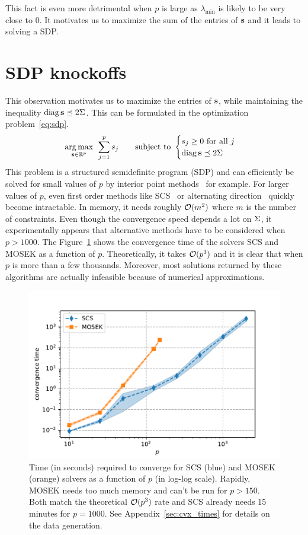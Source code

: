 This fact is even more detrimental when $p$ is large as $\lambda_{\min}$ is likely to be very close to $0$.
It motivates us to maximize the sum of the entries of $\mathbf{s}$ and it leads to solving a SDP\@.

\section{SDP knockoffs}\label{sec:sdp}

This observation motivates us to maximize the entries of $\mathbf{s}$,
while maintaining the inequality $\operatorname*{diag}\mathbf{s} \preceq 2\Sigma$.
This can be formulated in the optimization problem~\ref{eq:sdp}.
\begin{equation}\label{eq:sdp}
    \underset{\mathbf{s} \in \mathbb{R}^p}{\operatorname*{arg\,max}}\;\,
    \sum_{j = 1}^p s_j
    \qquad
    \text{subject to } \begin{cases}
        s_j \geq 0\text{ for all } j\\
        \operatorname*{diag} \mathbf{s} \preceq 2\Sigma
    \end{cases}
\end{equation}
This problem is a structured semidefinite program (SDP) and can efficiently be solved for small values of
$p$ by interior point methods~\cite{interior_point_method_sdp} for example.
For larger values of $p$, even first order methods like
SCS~\cite{sdp_scs} or alternating direction~\cite{sdp_admm}
quickly become intractable.
In memory, it needs roughly $\mathcal{O}(m^2)$ where $m$ is the number of constraints.
Even though the convergence speed depends a lot on $\Sigma$,
it experimentally appears that alternative methods have to be considered when $p > 1000$.
The Figure~\ref{fig:cvx_sdp_times} shows the convergence time of the solvers SCS and MOSEK as a function of $p$.
Theoretically, it takes $\mathcal{O}(p^3)$ and it is clear that when $p$ is more than a few thousands.
Moreover, most solutions returned by these algorithms are actually infeasible because of numerical approximations.

\begin{figure}
    \centering
    \includegraphics[width=0.8\linewidth, height=0.5\linewidth]{figures/cvx_sdp_times.pdf}
    \caption{
        Time (in seconds) required to converge for SCS (blue) and MOSEK (orange) solvers
        as a function of $p$ (in log-log scale).
        Rapidly, MOSEK needs too much memory and can't be run for $p > 150$.
        Both match the theoretical $\mathcal{O}(p^3)$ rate and SCS already needs 15 minutes for $p = 1000$.
        See Appendix~\ref{sec:cvx_times} for details on the data generation.
    }
    \label{fig:cvx_sdp_times}
\end{figure}

